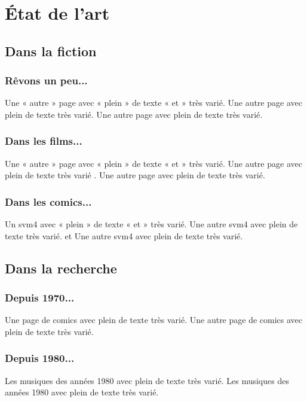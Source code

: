 \chapter{État de l'art}
    \label{CHAP_1_ETAT_DE_L_ART}

    \minitoc

    \section{Dans la fiction}

        \subsection{Rêvons un peu...}
            Une « autre » page avec « plein » de texte « et » très varié.
            Une autre page avec plein de texte très varié. \cite{ibm:2016, rasa:2017, wagstaff:2000}
            Une autre page avec plein de texte très varié. 

        \subsection{Dans les films...}
            Une « autre » page avec « plein » de texte « et » très varié.
            Une autre page avec plein de texte très varié .
            Une autre page avec plein de texte très varié.

        \subsection{Dans les comics...}
            Un \gls{svm4} avec « plein » de texte « et » très varié.
            Une autre \gls{svm4} avec plein de texte très varié. \cite{gancarski:2007} et \cite{lampert:2019}
            Une autre \gls{svm4} avec plein de texte très varié.

    \section{Dans la recherche}

        \subsection{Depuis 1970...}
            Une page de \gls{comics} avec plein de texte très varié.
            Une autre page de \gls{comics}  avec plein de texte très varié.

        \subsection{Depuis 1980...}
            Les musiques des années \gls{1980} avec plein de texte très varié.
            Les musiques des années \gls{1980} avec plein de texte très varié.

